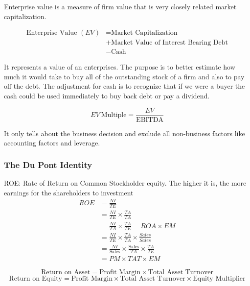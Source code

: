 \documentclass[10pt, a4paper]{article}
\begin{document}
            Enterprise value is a measure of firm value that is very closely related market capitalization.

            \begin{align*}
                \text{Enterprise\ Value } (EV) &= \text{Market\ Capitalization} \\
                                        &+ \text{Market\ Value\ of\ Interest\ Bearing\ Debt} \\
                                        &- \text{Cash}
            \end{align*}

            It represents a value of an enterprises. The purpose is to better estimate how much it would take to buy all of the outstanding stock of a firm and also to pay off the debt. The adjustment for cash is to recognize that if we were a buyer the cash could be used immediately to buy back debt or pay a dividend. 

            $$EV\ \text{Multiple} = \frac{EV}{\text{EBITDA}}$$

            It only tells about the business decision and exclude all non-business factors like accounting factors and leverage. 
            
        \subsubsection{The Du Pont Identity}
            ROE: Rate of Return on Common Stockholder equity. The higher it is, the more earnings for the shareholders to investment 
            \begin{align*}
                ROE &= \frac{NI}{TE} \\
                    &= \frac{NI}{TE} \times \frac{TA}{TA} \\
                    &= \frac{NI}{TA} \times \frac{TA}{TE} = ROA \times EM \\
                    &= \frac{NI}{TE} \times \frac{TA}{TA} \times \frac{Sales}{Sales}\\
                    &= \frac{NI}{\text{Sales}} \times \frac{\text{Sales}}{TA} \times \frac{TA}{TE}\\
                    &= PM \times TAT \times EM
            \end{align*}

            $$\text{Return on Asset} = \text{Profit Margin} \times \text{Total Asset Turnover}$$
            $$\text{Return on Equity} = \text{Profit Margin} \times \text{Total Asset Turnover} \times \text{Equity Multiplier}$$
\end{document}
